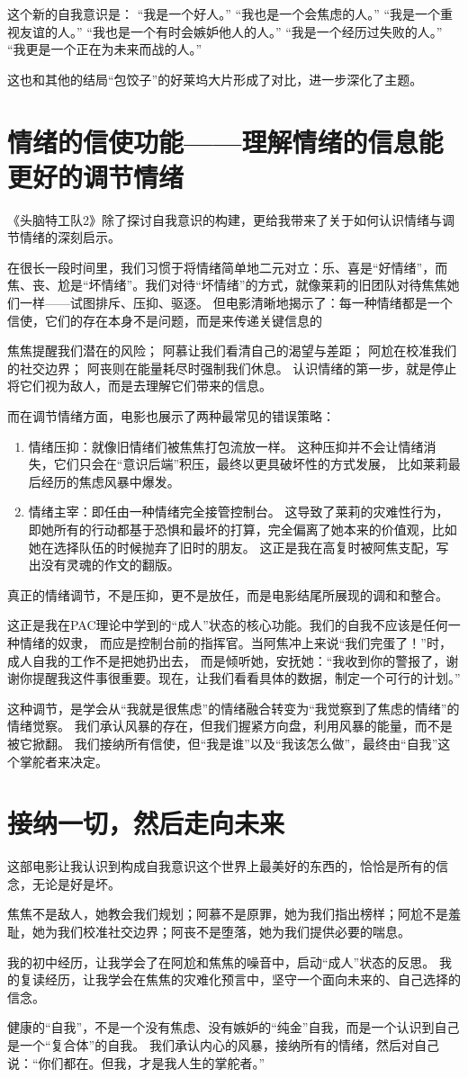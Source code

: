 \documentclass{ctexart}
\begin{document}
这个新的自我意识是：
“我是一个好人。”
“我也是一个会焦虑的人。”
“我是一个重视友谊的人。”
“我也是一个有时会嫉妒他人的人。”
“我是一个经历过失败的人。”
“我更是一个正在为未来而战的人。”

这也和其他的结局“包饺子”的好莱坞大片形成了对比，进一步深化了主题。
\section{情绪的信使功能——理解情绪的信息能更好的调节情绪}
《头脑特工队2》除了探讨自我意识的构建，更给我带来了关于如何认识情绪与调节情绪的深刻启示。

在很长一段时间里，我们习惯于将情绪简单地二元对立：乐、喜是“好情绪”，而焦、丧、尬是“坏情绪”。我们对待“坏情绪”的方式，就像莱莉的旧团队对待焦焦她们一样——试图排斥、压抑、驱逐。
但电影清晰地揭示了：每一种情绪都是一个信使，它们的存在本身不是问题，而是来传递关键信息的

焦焦提醒我们潜在的风险；
阿慕让我们看清自己的渴望与差距；
阿尬在校准我们的社交边界；
阿丧则在能量耗尽时强制我们休息。
认识情绪的第一步，就是停止将它们视为敌人，而是去理解它们带来的信息。

而在调节情绪方面，电影也展示了两种最常见的错误策略：
\begin{enumerate}
    \item 情绪压抑：就像旧情绪们被焦焦打包流放一样。
    这种压抑并不会让情绪消失，它们只会在“意识后端”积压，最终以更具破坏性的方式发展，
    比如莱莉最后经历的焦虑风暴中爆发。
    \item 情绪主宰：即任由一种情绪完全接管控制台。
    这导致了莱莉的灾难性行为，即她所有的行动都基于恐惧和最坏的打算，完全偏离了她本来的价值观，比如她在选择队伍的时候抛弃了旧时的朋友。
    这正是我在高复时被阿焦支配，写出没有灵魂的作文的翻版。
\end{enumerate}

真正的情绪调节，不是压抑，更不是放任，而是电影结尾所展现的调和和整合。

这正是我在PAC理论中学到的“成人”状态的核心功能。我们的自我不应该是任何一种情绪的奴隶，
而应是控制台前的指挥官。当阿焦冲上来说“我们完蛋了！”时，成人自我的工作不是把她扔出去，
而是倾听她，安抚她：“我收到你的警报了，谢谢你提醒我这件事很重要。现在，让我们看看具体的数据，制定一个可行的计划。”

这种调节，是学会从“我就是很焦虑”的情绪融合转变为“我觉察到了焦虑的情绪”的情绪觉察。
我们承认风暴的存在，但我们握紧方向盘，利用风暴的能量，而不是被它掀翻。
我们接纳所有信使，但“我是谁”以及“我该怎么做”，最终由“自我”这个掌舵者来决定。

\section{接纳一切，然后走向未来}
这部电影让我认识到构成自我意识这个世界上最美好的东西的，恰恰是所有的信念，无论是好是坏。

焦焦不是敌人，她教会我们规划；阿慕不是原罪，她为我们指出榜样；阿尬不是羞耻，她为我们校准社交边界；阿丧不是堕落，她为我们提供必要的喘息。

我的初中经历，让我学会了在阿尬和焦焦的噪音中，启动“成人”状态的反思。
我的复读经历，让我学会在焦焦的灾难化预言中，坚守一个面向未来的、自己选择的信念。

健康的“自我”，不是一个没有焦虑、没有嫉妒的“纯金”自我，而是一个认识到自己是一个“复合体”的自我。
我们承认内心的风暴，接纳所有的情绪，然后对自己说：“你们都在。但我，才是我人生的掌舵者。”
\end{document}
